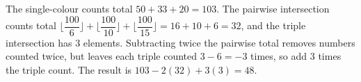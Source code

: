 The single-colour counts total $50+33+20=103$. The pairwise intersection counts total $\lfloor\dfrac{100}{6}\rfloor+\lfloor\dfrac{100}{10}\rfloor+\lfloor\dfrac{100}{15}\rfloor=16+10+6=32$, and the triple intersection has $3$ elements. Subtracting twice the pairwise total removes numbers counted twice, but leaves each triple counted $3-6=-3$ times, so add $3$ times the triple count. The result is $103-2(32)+3(3)=\boxed{48}$.
